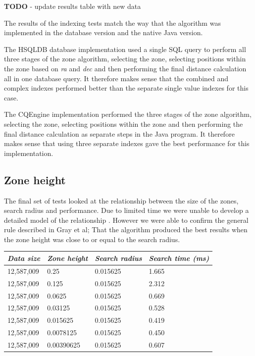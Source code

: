 \documentclass{article}
\newcommand{\hsqldb} {HSQLDB\xspace}
\newcommand{\cqengine} {CQEngine\xspace}
\begin{document}
\textbf{TODO} - update results table with new data

The results of the indexing tests match the way that the algorithm was implemented in the database version and the native Java version.

The \hsqldb database implementation used a single SQL query to perform all three stages of the zone algorithm, selecting the zone, selecting positions within the zone based on \textit{ra} and \textit{dec} and then performing the final distance calculation all in one database query. It therefore makes sense that the combined and complex indexes performed better than the separate single value indexes for this case.

The \cqengine implementation performed the three stages of the zone algorithm, selecting the zone, selecting positions within the zone and then performing the final distance calculation as separate steps in the Java program.  It therefore makes sense that using three separate indexes gave the best performance for this implementation.

\subsection{Zone height}
\label{zone-height}

The final set of tests looked at the relationship between the size of the zones, search radius and performance. Due to limited time we were unable to develop a detailed model of the relationship . However we were able to confirm the general rule described in Gray et al; That the algorithm produced the best results when the zone height was close to or equal to the search radius. 

\begin{table}[h]
\centering
\begin{tabular}{|l|l|l|l|}
\hline
\textit{Data size} & \textit{Zone height} & \textit{Search radius} & \textit{Search time (ms)} \\ \hline
12,587,009 & 0.25       & 0.015625 & 1.665 \\ \hline
12,587,009 & 0.125      & 0.015625 & 2.312 \\ \hline
12,587,009 & 0.0625     & 0.015625 & 0.669 \\ \hline
12,587,009 & 0.03125    & 0.015625 & 0.528 \\ \hline
12,587,009 & 0.015625   & 0.015625 & 0.419 \\ \hline
12,587,009 & 0.0078125  & 0.015625 & 0.450 \\ \hline
12,587,009 & 0.00390625 & 0.015625 & 0.607 \\ \hline
\end{tabular}
\end{table}
\end{document}
